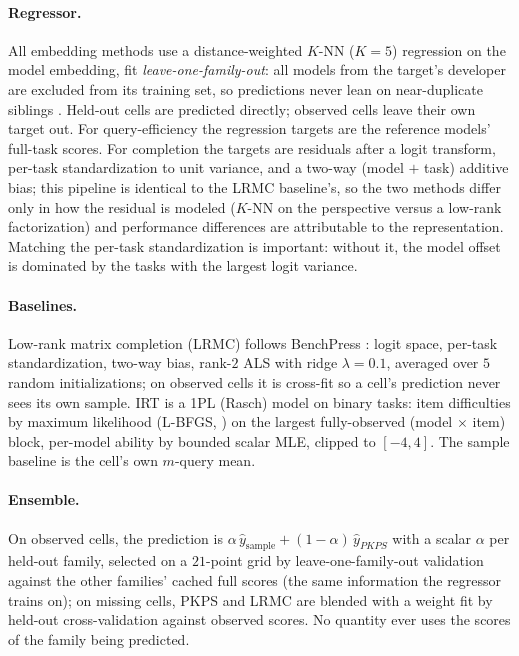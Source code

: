\documentclass{article}
\theoremstyle{definition}
\theoremstyle{plain}
\newcommand{\PKPS}{PKPS\xspace}
\begin{document}
\paragraph{Regressor.} All embedding methods use a distance-weighted $K$-NN ($K{=}5$)
regression on the model embedding, fit \emph{leave-one-family-out}: all models from the target's developer are
excluded from its training set, so predictions never lean on near-duplicate siblings
\citep{dkps_qeff}. Held-out cells are predicted directly; observed cells leave their own
target out. For query-efficiency the regression targets are the reference models'
full-task scores. For completion the targets are residuals after a logit transform,
per-task standardization to unit variance, and a two-way (model $+$ task) additive bias;
this pipeline is identical to the LRMC baseline's, so the two methods differ
only in how the residual is modeled ($K$-NN on the perspective versus a low-rank
factorization) and performance differences are attributable to the representation.
Matching the per-task standardization is important: without it, the model offset is
dominated by the tasks with the largest logit variance.

\paragraph{Baselines.} Low-rank matrix completion (LRMC) follows BenchPress \citep{benchpress}: logit
space, per-task standardization, two-way bias, rank-$2$ ALS with ridge $\lambda{=}0.1$,
averaged over $5$ random initializations; on observed cells it is cross-fit so a cell's
prediction never sees its own sample. IRT is a 1PL (Rasch) model  on binary tasks: item
difficulties by maximum likelihood (L-BFGS, ) on the largest fully-observed
(model $\times$ item) block, per-model ability by bounded scalar MLE, clipped to
$[-4,4]$. The sample baseline is the cell's own $m$-query mean.

\paragraph{Ensemble.} On observed cells, the prediction is $\alpha\,\hat
y_{\mathrm{sample}}+(1-\alpha)\,\hat y_{\PKPS}$ with a scalar $\alpha$ per held-out
family, selected on a $21$-point grid by leave-one-family-out validation against the
other families' cached full scores (the same information the regressor trains on); on
missing cells, \PKPS and LRMC are blended with a weight fit by held-out cross-validation
against observed scores. No quantity ever uses the scores of the family being predicted.
\end{document}
